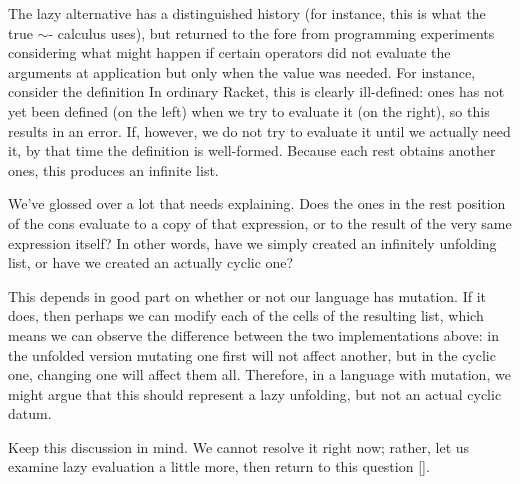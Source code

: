 
The lazy alternative has a distinguished history (for instance, this is what the
true $\sim$- calculus uses), but returned to the fore from programming
experiments considering what might happen if certain operators did not evaluate
the arguments at application but only when the value was needed. For instance,
consider the definition
In ordinary Racket, this is clearly ill-defined: ones has not yet been defined
(on the left) when we try to evaluate it (on the right), so this results in an
error. If, however, we do not try to evaluate it until we actually need it, by
that time the definition is well-formed. Because each rest obtains another ones,
this produces an infinite list.

We’ve glossed over a lot that needs explaining. Does the ones in the rest
position of the cons evaluate to a copy of that expression, or to the result of
the very same expression itself? In other words, have we simply created an
infinitely unfolding list, or have we created an actually cyclic one?

This depends in good part on whether or not our language has mutation. If it
does, then perhaps we can modify each of the cells of the resulting list, which
means we can observe the difference between the two implementations above: in
the unfolded version mutating one first will not affect another, but in the
cyclic one, changing one will affect them all. Therefore, in a language with
mutation, we might argue that this should represent a lazy unfolding, but not an
actual cyclic datum.

Keep this discussion in mind. We cannot resolve it right now; rather, let us
examine lazy evaluation a little more, then return to this question \ref{}.
